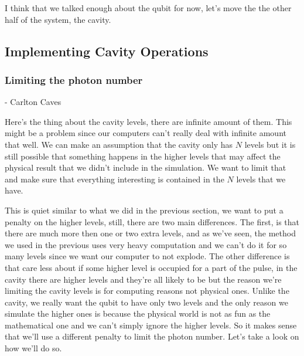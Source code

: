 \documentclass[english, a4paper, 12pt, twoside]{article}
\numberwithin{equation}{section} %
\begin{document}
I think that we talked enough about the qubit for now, let's move the the other half of the system, the cavity.



\subsection{Implementing Cavity Operations}
\subsubsection{Limiting the photon number} 
\centerline{}
\centerline{- Carlton Caves}
Here's the thing about the cavity levels, there are infinite amount of them. This might be a problem since our computers can't really deal with infinite amount that well. We can make an assumption that the cavity only has \(N\) levels but it is still possible that something happens in the higher levels that may affect the physical result that we didn't include in the simulation. We want to limit that and make sure that everything interesting is contained in the \(N\) levels that we have.

This is quiet similar to what we did in the previous section, we want to put a penalty on the higher levels, still, there are two main differences. The first, is that there are much more then one or two extra levels, and as we've seen, the method we used in the previous uses very heavy computation and we can't do it for so many levels since we want our computer to not explode. The other difference is that care less about if some higher level is occupied for a part of the pulse, in the cavity there are higher levels and they're all likely to be but the reason we're limiting the cavity levels is for computing reasons not physical ones. Unlike the cavity, we really want the qubit to have only two levels and the only reason we simulate the higher ones is because the physical world is not as fun as the mathematical one and we can't simply ignore the higher levels. So it makes sense that we'll use a different penalty to limit the photon number. Let's take a look on how we'll do so. 
\end{document}
